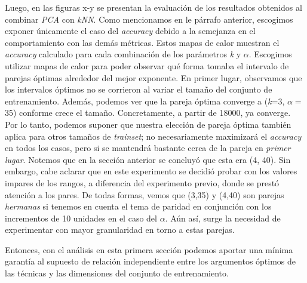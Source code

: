 \par
[heatmaps accracy segun k,alfa]
\par
Luego, en las figuras x-y se presentan la evaluación de los resultados obtenidos al combinar \emph{PCA} con \emph{kNN}. Como mencionamos en le párrafo anterior, escogimos exponer únicamente el caso del \emph{accuracy} debido a la semejanza en el comportamiento con las demás métricas. Estos mapas de calor muestran el \emph{accuracy} calculado para cada combinación de los parámetros \emph{k} y $\alpha$. Escogimos utilizar mapas de calor para poder observar qué forma tomaba el intervalo de parejas óptimas alrededor del mejor exponente. En primer lugar, observamos que los intervalos óptimos no se corrieron al variar el tamaño del conjunto de entrenamiento. Además, podemos ver que la pareja óptima converge a (\emph{k}=3, $\alpha=$35) conforme crece el tamaño. Concretamente, a partir de 18000, ya converge. Por lo tanto, podemos suponer que nuestra elección de pareja óptima también aplica para otros tamaños de \emph{trainset}; no necesariamente maximizará el \emph{accuracy} en todos los casos, pero si se mantendrá bastante cerca de la pareja en \emph{primer lugar}. Notemos que en la sección anterior se concluyó que esta era (4, 40). Sin embargo, cabe aclarar que en este experimento se decidió probar con los valores impares de los rangos, a diferencia del experimento previo, donde se prestó atención a los pares. De todas formas, vemos que (3,35) y (4,40) son parejas \emph{hermanas} si tenemos en cuenta el tema de paridad en conjunción con los incrementos de 10 unidades en el caso del $\alpha$. Aún así, surge la necesidad de experimentar con mayor granularidad en torno a estas parejas.
\par
Entonces, con el análisis en esta primera sección podemos aportar una mínima garantía al supuesto de relación independiente entre los argumentos óptimos de las técnicas y las dimensiones del conjunto de entrenamiento.
